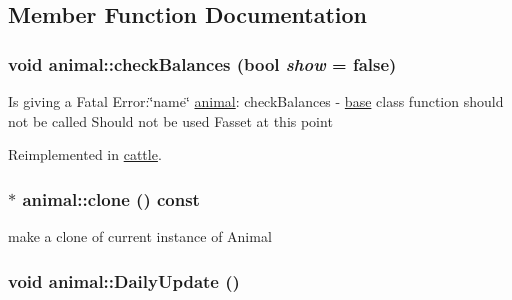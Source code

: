 \subsection{Member Function Documentation}
\hypertarget{classanimal_a393e6582d15379a0dd58c0d7e1faf9a7}{
\subsubsection[{checkBalances}]{\setlength{\rightskip}{0pt plus 5cm}void animal::checkBalances (bool {\em show} = {\ttfamily false})}}
\label{classanimal_a393e6582d15379a0dd58c0d7e1faf9a7}
Is giving a Fatal Error:\char`\"{}name\char`\"{} \hyperlink{classanimal}{animal}: checkBalances -\/ \hyperlink{classbase}{base} class function should not be called Should not be used Fasset at this point 

Reimplemented in \hyperlink{classcattle_a583babf76f49e8ab7dab411195bcda2e}{cattle}.\hypertarget{classanimal_a0dcbd91d8e8eddffa86451dab017f2aa}{
\subsubsection[{clone}]{ $\ast$ animal::clone () const}}
\label{classanimal_a0dcbd91d8e8eddffa86451dab017f2aa}
make a clone of current instance of Animal \hypertarget{classanimal_a96c8db4af03ae55b4acb96ed250ea065}{
\subsubsection[{DailyUpdate}]{\setlength{\rightskip}{0pt plus 5cm}void animal::DailyUpdate ()}}
\label{classanimal_a96c8db4af03ae55b4acb96ed250ea065}


